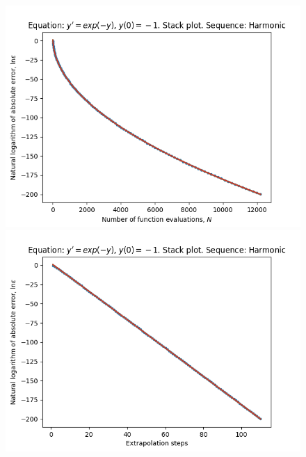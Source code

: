 \begin{figure}[H]
\centering
\begin{minipage}{0.45\textwidth}
\centering
\includegraphics[scale=0.45]{../results/emr_plots/ln_em1_hp_harmonic_stack.png}
\end{minipage}
\begin{minipage}{0.45\textwidth}
\centering
\includegraphics[scale=0.45]{../results/emr_plots/ln_em1_hp_harmonic_steps_stack.png}
\end{minipage}
\end{figure}

